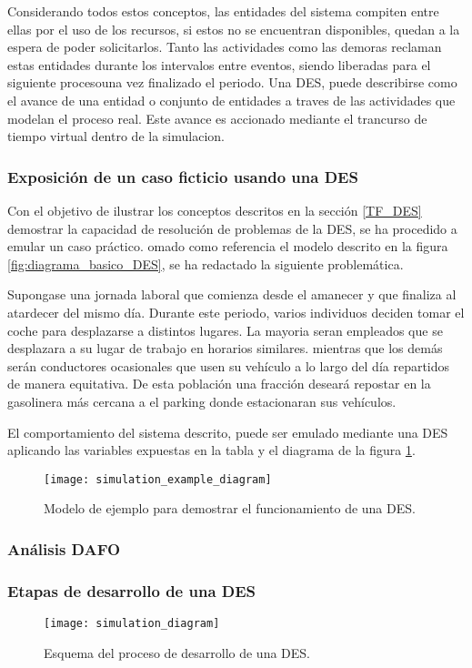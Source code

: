 Considerando todos estos conceptos,
las entidades del sistema compiten entre ellas por el uso de los recursos,
si estos no se encuentran disponibles, quedan a la espera de poder solicitarlos.
Tanto las actividades como las demoras reclaman estas entidades
durante los intervalos entre eventos,
siendo liberadas para el siguiente procesouna vez finalizado el periodo.
Una DES, puede describirse como el avance de una entidad o conjunto de entidades
a traves  de las actividades que modelan el proceso real.
Este avance es accionado
mediante el trancurso de tiempo virtual dentro de la simulacion.

\subsubsection{Exposición de un caso ficticio usando una DES}

Con el objetivo de ilustrar los conceptos descritos en la sección \ref{TF_DES}
 demostrar la capacidad de resolución de problemas de la DES,
 se ha procedido a emular un caso práctico.
 omado como referencia el modelo descrito en la figura
 \ref{fig:diagrama_basico_DES}, se ha redactado la siguiente problemática.

 Supongase una jornada laboral
 que comienza desde el amanecer y que finaliza al atardecer del mismo día.
 Durante este periodo, varios individuos deciden
 tomar el coche para desplazarse a distintos lugares.
 La mayoria seran empleados
 que se desplazara a su lugar de trabajo en horarios similares.
 mientras que los demás serán conductores ocasionales
 que usen su vehículo a lo largo del día repartidos de manera equitativa.
 De esta población una fracción deseará repostar
 en la gasolinera más cercana a el parking donde estacionaran sus vehículos.

 El comportamiento del sistema descrito,
 puede ser emulado mediante una DES aplicando las variables expuestas
 en la tabla y el diagrama de la figura \ref{fig:simulation_example_diagram}.

\begin{figure}
	\begin{center}
		\texttt{[image: simulation\_example\_diagram]}
	\end{center}
		\caption{Modelo de ejemplo para demostrar el funcionamiento de una DES.}
		\label{fig:simulation_example_diagram}
\end{figure}

\subsubsection{Análisis DAFO}

\subsubsection{Etapas de desarrollo de una DES}

\begin{figure}
	\begin{center}
		\texttt{[image: simulation\_diagram]}
	\end{center}
	\caption{Esquema del proceso de desarrollo de una DES.}
	\label{fig:simulation_diagram}
\end{figure}
